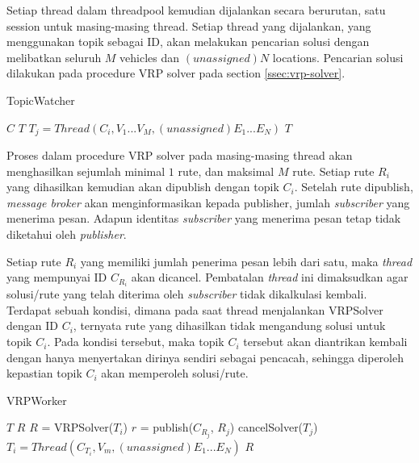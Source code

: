 \documentclass[conference]{IEEEtran}
\begin{document}
Setiap thread dalam threadpool kemudian dijalankan secara berurutan, satu session untuk masing-masing thread. Setiap thread yang dijalankan, yang menggunakan topik sebagai ID, akan melakukan pencarian solusi dengan melibatkan seluruh $M$ vehicles dan $(unassigned) N$ locations. Pencarian solusi dilakukan pada procedure VRP solver pada section \ref{ssec:vrp-solver}.


\begin{algorithm}[h]
	\caption{TopicWatcher}
	\begin{algorithmic}[1]
		\renewcommand{\algorithmicrequire}{\textbf{Input:}}
		\renewcommand{\algorithmicensure}{\textbf{Output:}}
		\REQUIRE $C$
		\ENSURE  $T$
					\STATE $T_j = Thread(C_i, V_1...V_M, (unassigned) E_1...E_N)$
				\ENDIF
			\ENDFOR
		\ENDFOR
		\RETURN $T$
	\end{algorithmic}
\end{algorithm}


Proses dalam procedure VRP solver pada masing-masing thread akan menghasilkan sejumlah minimal $1$ rute, dan maksimal $M$ rute. Setiap rute $R_i$ yang dihasilkan kemudian akan dipublish dengan topik $C_i$. Setelah rute dipublish, \textit{message broker} akan menginformasikan kepada publisher, jumlah \textit{subscriber} yang menerima pesan. Adapun identitas \textit{subscriber} yang menerima pesan tetap tidak diketahui oleh \textit{publisher}.


Setiap rute $R_i$ yang memiliki jumlah penerima pesan lebih dari satu, maka \textit{thread} yang mempunyai ID $C_{R_i}$ akan dicancel. Pembatalan \textit{thread} ini dimaksudkan agar solusi/rute yang telah diterima oleh \textit{subscriber} tidak dikalkulasi kembali. Terdapat sebuah kondisi, dimana pada saat thread menjalankan VRPSolver dengan ID $C_i$, ternyata rute yang dihasilkan tidak mengandung solusi untuk topik $C_i$. Pada kondisi tersebut, maka topik $C_i$ tersebut akan diantrikan kembali dengan hanya menyertakan dirinya sendiri sebagai pencacah, sehingga diperoleh kepastian topik $C_i$ akan memperoleh solusi/rute.


\begin{algorithm}[h]
	\caption{VRPWorker}
	\label{alg:vrp-worker}
	\begin{algorithmic}[1]
		\renewcommand{\algorithmicrequire}{\textbf{Input:}}
		\renewcommand{\algorithmicensure}{\textbf{Output:}}
		\REQUIRE $T$
		\ENSURE  $R$
			\STATE $R$ = VRPSolver($T_i$)
				\STATE $r$ = publish($C_{R_j}$, $R_j$)
					\STATE cancelSolver($T_j$)
					\STATE $T_i = Thread(C_{T_i}, V_m, (unassigned) E_1...E_N)$
				\ENDIF
			\ENDFOR
		\ENDFOR
		\RETURN $R$
	\end{algorithmic}
\end{algorithm}
\end{document}
